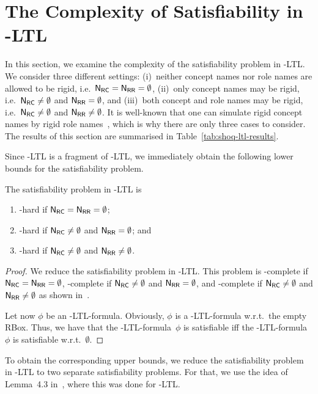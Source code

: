 \section{The Complexity of Satisfiability in \texorpdfstring{\SHOQ-LTL}{SHOQ-LTL}}\label{sec:complexity-shoq-ltl}

In this section, we examine the complexity of the satisfiability problem in
\SHOQ-LTL\@.  We consider three different settings: (i)~neither concept names
nor role names are allowed to be rigid, i.e.~$\mathsf{N_{RC}}=\mathsf{N_{RR}}=\emptyset$, (ii)~only
concept names may be rigid, i.e.~$\mathsf{N_{RC}}\ne\emptyset$ and $\mathsf{N_{RR}}=\emptyset$, and
(iii)~both concept and role names may be rigid, i.e.~$\mathsf{N_{RC}}\ne\emptyset$ and
$\mathsf{N_{RR}}\ne\emptyset$.  It is well-known that one can simulate rigid concept names
by rigid role names~\cite{BaGL-ToCL12}, which is why there are only three cases
to consider.  The results of this section are summarised in
Table~\ref{tab:shoq-ltl-results}.

Since \ALC-LTL is a fragment of \SHOQ-LTL, we immediately obtain the following
lower bounds for the satisfiability problem.

\begin{theorem}\label{thm:lower-bounds-shoq-ltl}
    The satisfiability problem in \SHOQ-LTL is
    \begin{enumerate}
        \item \ExpTime-hard if $\mathsf{N_{RC}}=\mathsf{N_{RR}}=\emptyset$;
        \item \NExpTime-hard if $\mathsf{N_{RC}}\ne\emptyset$ and $\mathsf{N_{RR}}=\emptyset$; and
        \item \TwoExpTime-hard if $\mathsf{N_{RC}}\ne\emptyset$ and $\mathsf{N_{RR}}\ne\emptyset$.
    \end{enumerate}
\end{theorem}

\begin{proof}
    We reduce the satisfiability problem in \ALC-LTL\@.  This problem is
    \ExpTime-complete if $\mathsf{N_{RC}}=\mathsf{N_{RR}}=\emptyset$, \NExpTime-complete if
    $\mathsf{N_{RC}}\ne\emptyset$ and $\mathsf{N_{RR}}=\emptyset$, and \TwoExpTime-complete if
    $\mathsf{N_{RC}}\ne\emptyset$ and $\mathsf{N_{RR}}\ne\emptyset$ as shown in~\cite{BaGL-ToCL12}.

    Let now $\phi$ be an \ALC-LTL-formula.  Obviously, $\phi$ is a
    \SHOQ-LTL-formula w.r.t.\ the empty RBox.  Thus, we have that the
    \ALC-LTL-formula~$\phi$ is satisfiable iff the \SHOQ-LTL-formula~$\phi$
    is satisfiable w.r.t.~$\emptyset$.
\end{proof}

\noindent
To obtain the corresponding upper bounds, we reduce the satisfiability problem
in \SHOQ-LTL to two separate satisfiability problems.  For that, we use the idea
of Lemma~4.3 in~\cite{BaGL-ToCL12}, where this was done for \ALC-LTL\@.

